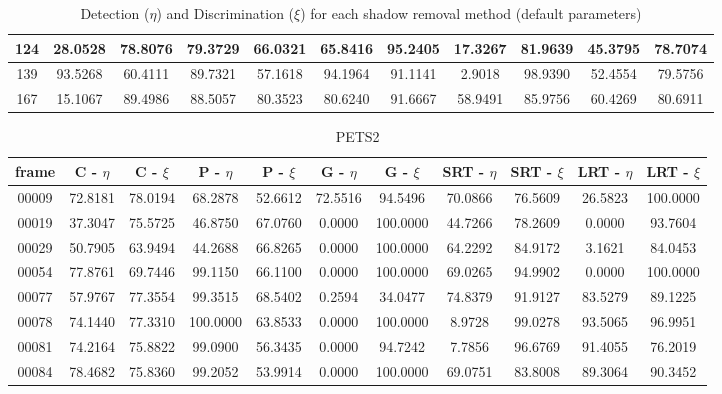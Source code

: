 \begin{appendices}
\begin{table}
\begin{tabular}{ |c|c|c|c|c|c|c|c|c|c|c| }
\hline
124 & 28.0528 &  78.8076 &   79.3729 &  66.0321 &   65.8416 &  95.2405 &   17.3267 &  81.9639 &   45.3795 &  78.7074 \\
\hline
139 & 93.5268 &  60.4111 &   89.7321 &  57.1618 &   94.1964 &  91.1141 &   2.9018 &  98.9390 &   52.4554 &  79.5756 \\
\hline
167 & 15.1067 &  89.4986 &   88.5057 &  80.3523 &   80.6240 &  91.6667 &   58.9491 &  85.9756 &   60.4269 &  80.6911 \\
\hline
\end{tabular}
\caption*{Detection ($\eta$) and Discrimination ($\xi$) for each shadow removal method (default parameters)}
\end{table}

\begin{table}
\centering
\caption{PETS2}
\begin{tabular}{ |c|c|c|c|c|c|c|c|c|c|c| }
	\hline
\textbf{frame} &  \textbf{C - $\eta$} &  \textbf{C - $\xi$} &  \textbf{P - $\eta$} &  \textbf{P - $\xi$} &  \textbf{G - $\eta$} &  \textbf{G - $\xi$} &  \textbf{SRT - $\eta$} &  \textbf{SRT - $\xi$} &  \textbf{LRT - $\eta$} &  \textbf{LRT - $\xi$} \\
\hline
\hline
00009 &  72.8181 &  78.0194 &   68.2878 &  52.6612 &   72.5516 &  94.5496 &   70.0866 &  76.5609 &   26.5823 &  100.0000 \\
\hline
00019 &  37.3047 &  75.5725 &   46.8750 &  67.0760 &   0.0000 &  100.0000 &   44.7266 &  78.2609 &   0.0000 &  93.7604 \\
\hline
00029 &  50.7905 &  63.9494 &   44.2688 &  66.8265 &   0.0000 &  100.0000 &   64.2292 &  84.9172 &   3.1621 &  84.0453 \\
\hline
00054 &  77.8761 &  69.7446 &   99.1150 &  66.1100 &   0.0000 &  100.0000 &   69.0265 &  94.9902 &   0.0000 &  100.0000 \\
\hline
00077 &  57.9767 &  77.3554 &   99.3515 &  68.5402 &   0.2594 &  34.0477 &   74.8379 &  91.9127 &   83.5279 &  89.1225 \\
\hline
00078 &  74.1440 &  77.3310 &   100.0000 &  63.8533 &   0.0000 &  100.0000 &   8.9728 &  99.0278 &   93.5065 &  96.9951 \\
\hline
00081 &  74.2164 &  75.8822 &   99.0900 &  56.3435 &   0.0000 &  94.7242 &   7.7856 &  96.6769 &   91.4055 &  76.2019 \\
\hline
00084 &  78.4682 &  75.8360 &   99.2052 &  53.9914 &   0.0000 &  100.0000 &   69.0751 &  83.8008 &   89.3064 &  90.3452 \\

\end{tabular}
\end{table}
\end{appendices}

